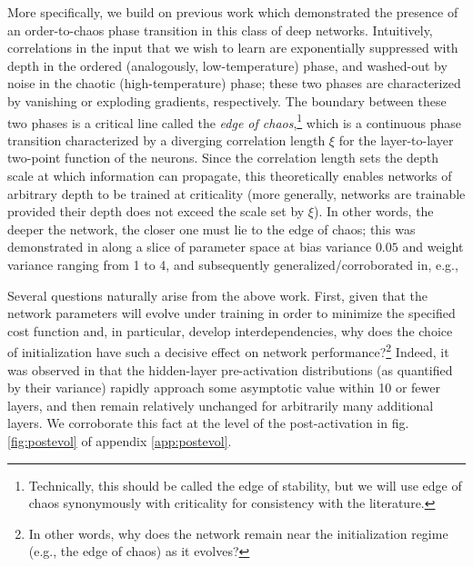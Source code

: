 More specifically, we build on previous work \cite{arxiv.1606.05340,2016arXiv161101232S} which demonstrated the presence of an order-to-chaos phase transition in this class of deep networks. Intui\-tively, correlations in the input that we wish to learn are exponentially suppressed with depth in the ordered (analogously, low-temperature) phase, and washed-out by noise in the chaotic (high-temperature) phase; these two phases are characterized by vanishing or exploding gradients, respectively. The boundary between these two phases is a critical line called the \emph{edge of chaos},\footnote{Technically, this should be called the edge of stability, but we will use edge of chaos synonymously with criticality for consistency with the literature.} which is a continuous phase transition characterized by a diverging correlation length $\xi$ for the layer-to-layer two-point function of the neurons. Since the correlation length sets the depth scale at which information can propagate, this theoretically enables networks of arbitrary depth to be trained at criticality (more generally, networks are trainable provided their depth does not exceed the scale set by $\xi$). In other words, the deeper the network, the closer one must lie to the edge of chaos; this was demonstrated in \cite{2016arXiv161101232S} along a slice of parameter space at bias variance $0.05$ and weight variance ranging from 1 to 4, and subsequently generalized/corroborated in, e.g., \cite{arxiv.1806.05393,arxiv.1806.05394,Erdmenger:2021sot}

Several questions naturally arise from the above work. First, given that the network parameters will evolve under training in order to minimize the specified cost function and, in particular, develop interdependencies, why does the choice of initialization have such a decisive effect on network performance?\footnote{In other words, why does the network remain near the initialization regime (e.g., the edge of chaos) as it evolves?} Indeed, it was observed in \cite{Erdmenger:2021sot} that the hidden-layer pre-activation distributions (as quantified by their variance) rapidly approach some asymptotic value within 10 or fewer layers, and then remain relatively unchanged for arbitrarily many additional layers. We corroborate this fact at the level of the post-activation in fig. \ref{fig:postevol} of appendix \ref{app:postevol}.


